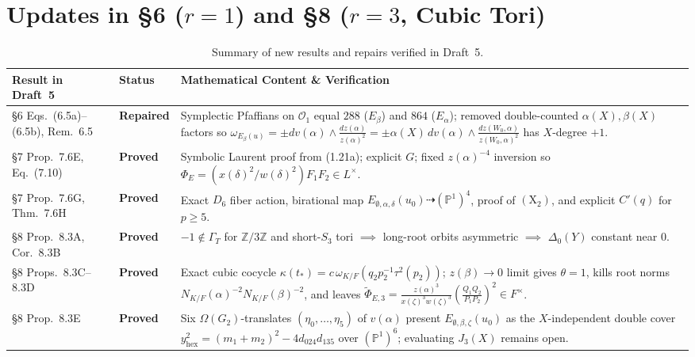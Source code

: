 \documentclass[11pt,letterpaper]{article}
\newcommand{\ooo}{\mathcal{O}}
\begin{document}
\section{\texorpdfstring{Updates in \S6 ($r=1$) and \S8 ($r=3$, Cubic Tori)}{Updates in Section 6 (r=1) and Section 8 (r=3, Cubic Tori)}}

\begin{table}[!htbp]
\centering
\small
\begin{tabularx}{\linewidth}{@{}l l X@{}}
\toprule
\textbf{Result in Draft~5} & \textbf{Status} & \textbf{Mathematical Content \& Verification} \\
\midrule
\S6 Eqs.~(6.5a)--(6.5b), Rem.~6.5 & {\color{okgreen}\textbf{Repaired}} & Symplectic Pfaffians on $\ooo_1$ equal $288$ ($E_\beta$) and $864$ ($E_\alpha$); removed double-counted $\alpha(X),\beta(X)$ factors so $\omega_{E_\beta(u)}=\pm dv(\alpha)\wedge\frac{dz(\alpha)}{z(\alpha)^2}=\pm\alpha(X)\,dv(\alpha)\wedge\frac{dz(W_0,\alpha)}{z(W_0,\alpha)^2}$ has $X$-degree $+1$. \\
\S7 Prop.~7.6E, Eq.~(7.10) & {\color{okgreen}\textbf{Proved}} & Symbolic Laurent proof from (1.21a); explicit $G$; fixed $z(\alpha)^{-4}$ inversion so $\Phi_E=(x(\delta)^2/w(\delta)^2)F_1F_2\in L^\times$. \\
\S7 Prop.~7.6G, Thm.~7.6H & {\color{okgreen}\textbf{Proved}} & Exact $D_6$ fiber action, birational map $E_{\emptyset,\alpha,\delta}(u_0)\dashrightarrow(\mathbb{P}^1)^4$, proof of $(\mathrm{X}_2)$, and explicit $C'(q)$ for $p\ge 5$. \\
\S8 Prop.~8.3A, Cor.~8.3B & {\color{okgreen}\textbf{Proved}} & $-1\notin\Gamma_T$ for $\mathbb{Z}/3\mathbb{Z}$ and short-$S_3$ tori $\implies$ long-root orbits asymmetric $\implies$ $\Delta_0(Y)$ constant near $0$. \\
\S8 Props.~8.3C--8.3D & {\color{okgreen}\textbf{Proved}} & Exact cubic cocycle $\kappa(t_*)=c\,\omega_{K/F}(q_2p_2^{-1}\tau^2(p_2))$; $z(\beta)\to 0$ limit gives $\theta=1$, kills root norms $N_{K/F}(\alpha)^{-2}N_{K/F}(\beta)^{-2}$, and leaves $\tilde\Phi_{E,3}=\frac{z(\alpha)^3}{x(\zeta)^3w(\zeta)^3}(\frac{Q_1Q_2}{P_1P_2})^2\in F^\times$. \\
\S8 Prop.~8.3E & {\color{okgreen}\textbf{Proved}} & Six $\Omega(G_2)$-translates $(\eta_0,\dots,\eta_5)$ of $v(\alpha)$ present $E_{\emptyset,\beta,\zeta}(u_0)$ as the $X$-independent double cover $y_{\mathrm{hex}}^2=(m_1+m_2)^2-4d_{024}d_{135}$ over $(\mathbb{P}^1)^6$; evaluating $J_3(X)$ remains open. \\
\bottomrule
\end{tabularx}
\caption{Summary of new results and repairs verified in Draft~5.}
\end{table}
\end{document}
